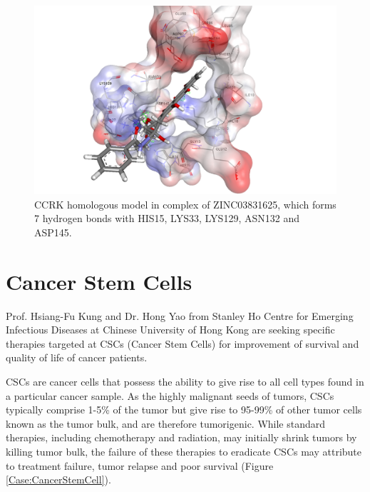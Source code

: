\begin{figure}
\centering
\includegraphics[width=\linewidth]{Case/1HCL-ZINC03831625.png}
\caption{CCRK homologous model in complex of ZINC03831625, which forms 7 hydrogen bonds with HIS15, LYS33, LYS129, ASN132 and ASP145.}
\label{Case:1HCL-ZINC03831625}
\end{figure}

\section{Cancer Stem Cells}

Prof. Hsiang-Fu Kung and Dr. Hong Yao from Stanley Ho Centre for Emerging Infectious Diseases at Chinese University of Hong Kong are seeking specific therapies targeted at CSCs (Cancer Stem Cells) for improvement of survival and quality of life of cancer patients.

CSCs are cancer cells that possess the ability to give rise to all cell types found in a particular cancer sample. As the highly malignant seeds of tumors, CSCs typically comprise 1-5\% of the tumor but give rise to 95-99\% of other tumor cells known as the tumor bulk, and are therefore tumorigenic. While standard therapies, including chemotherapy and radiation, may initially shrink tumors by killing tumor bulk, the failure of these therapies to eradicate CSCs may attribute to treatment failure, tumor relapse and poor survival (Figure \ref{Case:CancerStemCell}).

